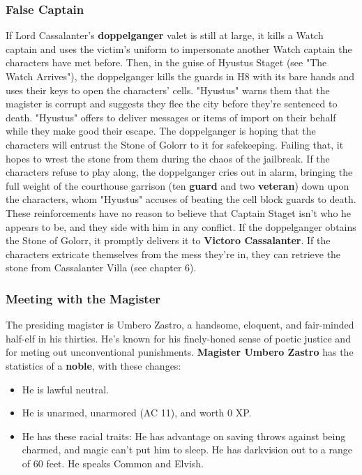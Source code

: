\documentclass[10pt,a4paper,twoside,twocolumn,openany,nodeprecatedcode]{dndbook}
\begin{document}
\subsubsection{False Captain}
If Lord Cassalanter's \textbf{doppelganger} valet is still at large, it kills a Watch captain and uses the victim's uniform to impersonate another Watch captain the characters have met before. Then, in the guise of Hyustus Staget (see "The Watch Arrives"), the doppelganger kills the guards in H8 with its bare hands and uses their keys to open the characters' cells. "Hyustus" warns them that the magister is corrupt and suggests they flee the city before they're sentenced to death. "Hyustus" offers to deliver messages or items of import on their behalf while they make good their escape. The doppelganger is hoping that the characters will entrust the Stone of Golorr to it for safekeeping. Failing that, it hopes to wrest the stone from them during the chaos of the jailbreak.
If the characters refuse to play along, the doppelganger cries out in alarm, bringing the full weight of the courthouse garrison (ten \textbf{guard} and two \textbf{veteran}) down upon the characters, whom "Hyustus" accuses of beating the cell block guards to death. These reinforcements have no reason to believe that Captain Staget isn't who he appears to be, and they side with him in any conflict.
If the doppelganger obtains the Stone of Golorr, it promptly delivers it to \textbf{Victoro Cassalanter}. If the characters extricate themselves from the mess they're in, they can retrieve the stone from Cassalanter Villa (see chapter 6).
\subsubsection{Meeting with the Magister}
The presiding magister is Umbero Zastro, a handsome, eloquent, and fair-minded half-elf in his thirties. He's known for his finely-honed sense of poetic justice and for meting out unconventional punishments.
\textbf{Magister Umbero Zastro} has the statistics of a \textbf{noble}, with these changes:
\begin{itemize}

\item He is lawful neutral.
\item He is unarmed, unarmored (AC 11), and worth 0 XP.
\item He has these racial traits: He has advantage on saving throws against being charmed, and magic can't put him to sleep. He has darkvision out to a range of 60 feet. He speaks Common and Elvish.
\end{itemize}
\end{document}
